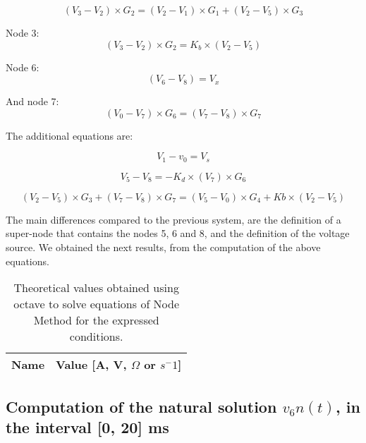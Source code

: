 \begin {equation}
  (V_3 - V_2)\times G_2 = (V_2 - V_1)\times G_1 + (V_2 - V_5)\times G_3
  \label {eq:kvl}
\end{equation}

Node 3:
\begin{equation}
(V_3- V_2)\times G_2 = K_b\times (V_2 - V_5)
  \label {eq:kvl}
\end{equation}

Node 6:
\begin {equation}
(V_6 - V_8)= V_x
  \label {eq:kvl}
\end{equation}

And node 7:
\begin {equation}
(V_0-V_7)\times G_6 = (V_7 - V_8)\times G_7
  \label {eq:kvl}
\end{equation}

The additional equations are:

\begin {equation}
V_1 - v_0= V_s
  \label {eq:kvl}
\end{equation}

\begin {equation}
V_5 - V_8 = -K_d\times (V_7)\times G_6
  \label {eq:kvl}
\end{equation}

\begin {equation}
  (V_2 - V_5)\times G_3 + (V_7 - V_8)\times G_7 = (V_5 - V_0)\times G_4 + Kb\times(V_2 - V_5)
  \label {eq:kvl}
\end{equation}



The main differences compared to the previous system, are the definition of a super-node that contains the nodes 5, 6 and 8, and the definition of the voltage source. We obtained the next results, from the computation of the above equations.



\begin{table}[h]
  \centering
  \begin{tabular}{|l|r|}
    \hline    
    {\bf Name} & {\bf Value [A, V, $\Omega$ or $s^-1$]} \\ \hline
    
  \end{tabular}
  \caption{Theoretical values obtained using octave to solve equations of Node Method for the expressed conditions.}
  \label{tab:DS}
\end{table}


\subsection{Computation of the natural solution $v_6n(t)$, in the interval [0, 20] ms}


